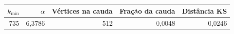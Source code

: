 \begin{tabular}{rrrrr}
\toprule
$k_{\min}$ & $\alpha$ & Vértices na cauda & Fração da cauda & Distância KS \\
\midrule
735 & 6,3786 & 512 & 0,0048 & 0,0246 \\
\bottomrule
\end{tabular}
